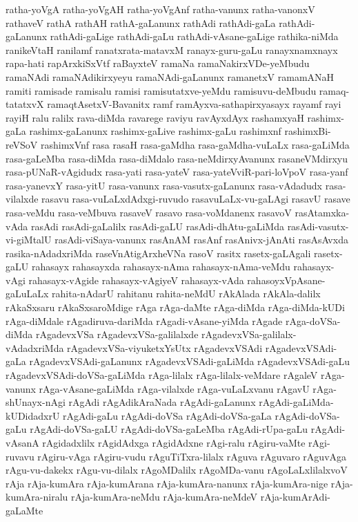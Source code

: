 {ratha-yoVgA
ratha-yoVgAH
ratha-yoVgAnf
ratha-vanunx
ratha-vanonxV
rathaveV
rathA
rathAH
rathA-gaLanunx
rathAdi
rathAdi-gaLa
rathAdi-gaLanunx
rathAdi-gaLige
rathAdi-gaLu
rathAdi-vAsane-gaLige
rathika-niMda
ranikeVtaH
ranilamf
ranatxrata-matavxM
ranayx-guru-gaLu
ranayxnamxnayx
rapa-hati
rapArxkiSxVtf
raBayxteV
ramaNa
ramaNakirxVDe-yeMbudu
ramaNAdi
ramaNAdikirxyeyu
ramaNAdi-gaLanunx
ramanetxV
ramamANaH
ramiti
ramisade
ramisalu
ramisi
ramisutatxve-yeMdu
ramisuvu-deMbudu
ramaq-tatatxvX
ramaqtAsetxV-Bavanitx
ramf
ramAyxva-sathapirxyasayx
rayamf
rayi
rayiH
ralu
ralilx
rava-diMda
ravarege
raviyu
ravAyxdAyx
rashamxyaH
rashimx-gaLa
rashimx-gaLanunx
rashimx-gaLive
rashimx-gaLu
rashimxnf
rashimxBi-reVSoV
rashimxVnf
rasa
rasaH
rasa-gaMdha
rasa-gaMdha-vuLaLx
rasa-gaLiMda
rasa-gaLeMba
rasa-diMda
rasa-diMdalo
rasa-neMdirxyAvanunx
rasaneVMdirxyu
rasa-pUNaR-vAgidudx
rasa-yati
rasa-yateV
rasa-yateVviR-pari-loVpoV
rasa-yanf
rasa-yanevxY
rasa-yitU
rasa-vanunx
rasa-vasutx-gaLanunx
rasa-vAdadudx
rasa-vilalxde
rasavu
rasa-vuLaLxdAdxgi-ruvudo
rasavuLaLx-vu-gaLAgi
rasavU
rasave
rasa-veMdu
rasa-veMbuva
rasaveV
rasavo
rasa-voMdanenx
rasavoV
rasAtamxka-vAda
rasAdi
rasAdi-gaLalilx
rasAdi-gaLU
rasAdi-dhAtu-gaLiMda
rasAdi-vasutx-vi-giMtalU
rasAdi-viSaya-vanunx
rasAnAM
rasAnf
rasAnivx-jAnAti
rasAsAvxda
rasika-nAdadxriMda
raseVnAtigArxheVNa
rasoV
rasitx
rasetx-gaLAgali
rasetx-gaLU
rahasayx
rahasayxda
rahasayx-nAma
rahasayx-nAma-veMdu
rahasayx-vAgi
rahasayx-vAgide
rahasayx-vAgiyeV
rahasayx-vAda
rahasoyxVpAsane-gaLuLaLx
rahita-nAdarU
rahitanu
rahita-neMdU
rAkAlada
rAkAla-dalilx
rAkaSxsaru
rAkaSxsaroMdige
rAga
rAga-daMte
rAga-diMda
rAga-diMda-kUDi
rAga-diMdale
rAgadiruva-dariMda
rAgadi-vAsane-yiMda
rAgade
rAga-doVSa-diMda
rAgadevxVSa
rAgadevxVSa-galilalxde
rAgadevxVSa-galilalx-vAdadxriMda
rAgadevxVSa-viyuketxYsUtx
rAgadevxVSAdi
rAgadevxVSAdi-gaLa
rAgadevxVSAdi-gaLanunx
rAgadevxVSAdi-gaLiMda
rAgadevxVSAdi-gaLu
rAgadevxVSAdi-doVSa-gaLiMda
rAga-lilalx
rAga-lilalx-veMdare
rAgaleV
rAga-vanunx
rAga-vAsane-gaLiMda
rAga-vilalxde
rAga-vuLaLxvanu
rAgavU
rAga-shUnayx-nAgi
rAgAdi
rAgAdikAraNada
rAgAdi-gaLanunx
rAgAdi-gaLiMda-kUDidadxrU
rAgAdi-gaLu
rAgAdi-doVSa
rAgAdi-doVSa-gaLa
rAgAdi-doVSa-gaLu
rAgAdi-doVSa-gaLU
rAgAdi-doVSa-gaLeMba
rAgAdi-rUpa-gaLu
rAgAdi-vAsanA
rAgidadxlilx
rAgidAdxga
rAgidAdxne
rAgi-ralu
rAgiru-vaMte
rAgi-ruvavu
rAgiru-vAga
rAgiru-vudu
rAguTiTxra-lilalx
rAguva
rAguvaro
rAguvAga
rAgu-vu-dakekx
rAgu-vu-dilalx
rAgoMDalilx
rAgoMDa-vanu
rAgoLaLxlilalxvoV
rAja
rAja-kumAra
rAja-kumArana
rAja-kumAra-nanunx
rAja-kumAra-nige
rAja-kumAra-niralu
rAja-kumAra-neMdu
rAja-kumAra-neMdeV
rAja-kumArAdi-gaLaMte
}
